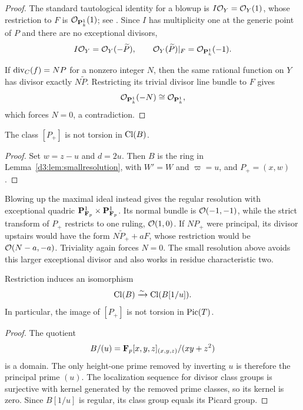 \begin{proof}
The standard tautological identity for a blowup is $I\mathcal O_Y=\mathcal O_Y(1)$, whose restriction to $F$ is $\mathcal O_{\mathbf P^1_k}(1)$; see \cite[Lemma~31.33.4, Tag~02OS]{StacksBlowup}. Since $I$ has multiplicity one at the generic point of $P$ and there are no exceptional divisors,
\[
I\mathcal O_Y=\mathcal O_Y(-\widetilde P),\qquad
\mathcal O_Y(\widetilde P)|_F=\mathcal O_{\mathbf P^1_k}(-1).
\]

If $\operatorname{div}_C(f)=NP$ for a nonzero integer $N$, then the same rational function on $Y$ has divisor exactly $N\widetilde P$. Restricting its trivial divisor line bundle to $F$ gives
\[
\mathcal O_{\mathbf P^1_k}(-N)\cong\mathcal O_{\mathbf P^1_k},
\]
which forces $N=0$, a contradiction.
\end{proof}

\begin{corollary}\label{d3:lem:clnonzero}
The class $[P_+]$ is not torsion in $\operatorname{Cl}(B)$.
\end{corollary}
\begin{proof}
Set $w=z-u$ and $d=2u$. Then $B$ is the ring in Lemma~\ref{d3:lem:smallresolution}, with $W'=W$ and $\varpi=u$, and $P_+=(x,w)$.
\end{proof}

\begin{remark}
Blowing up the maximal ideal instead gives the regular resolution with exceptional quadric $\mathbf P^1_{\mathbf F_p}\times\mathbf P^1_{\mathbf F_p}$. Its normal bundle is $\mathcal O(-1,-1)$, while the strict transform of $P_+$ restricts to one ruling, $\mathcal O(1,0)$. If $NP_+$ were principal, its divisor upstairs would have the form $N\widetilde P_++aF$, whose restriction would be $\mathcal O(N-a,-a)$. Triviality again forces $N=0$. The small resolution above avoids this larger exceptional divisor and also works in residue characteristic two.
\end{remark}

\begin{lemma}\label{d3:lem:invertu}
Restriction induces an isomorphism
\[
\operatorname{Cl}(B)\xrightarrow{\sim}\operatorname{Cl}(B[1/u]).
\]
In particular, the image of $[P_+]$ is not torsion in $\operatorname{Pic}(T)$.
\end{lemma}
\begin{proof}
The quotient
\[
B/(u)=\mathbf F_p[x,y,z]_{(x,y,z)}/(xy+z^2)
\]
is a domain. The only height-one prime removed by inverting $u$ is therefore the principal prime $(u)$. The localization sequence for divisor class groups is surjective with kernel generated by the removed prime classes, so its kernel is zero. Since $B[1/u]$ is regular, its class group equals its Picard group.
\end{proof}

